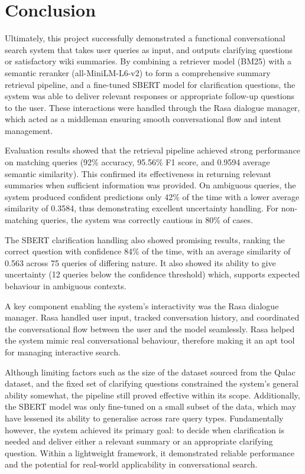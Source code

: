 \documentclass[11pt]{article}
\begin{document}
\section{Conclusion}
Ultimately, this project successfully demonstrated a functional conversational search system that takes user queries as input, and outputs clarifying questions or satisfactory wiki summaries. By combining a retriever model (BM25) with a semantic reranker (all-MiniLM-L6-v2) to form a comprehensive summary retrieval pipeline, and a fine-tuned SBERT model for clarification questions, the system was able to deliver relevant responses or appropriate follow-up questions to the user. These interactions were handled through the Rasa dialogue manager, which acted as a middleman ensuring smooth conversational flow and intent management.

Evaluation results showed that the retrieval pipeline achieved strong performance on matching queries (92\% accuracy, 95.56\% F1 score, and 0.9594 average semantic similarity). This confirmed its effectiveness in returning relevant summaries when sufficient information was provided. On ambiguous queries, the system produced confident predictions only 42\% of the time with a lower average similarity of 0.3584, thus demonstrating excellent uncertainty handling. For non-matching queries, the system was correctly cautious in 80\% of cases.

The SBERT clarification handling also showed promising results, ranking the correct question with confidence 84\% of the time, with an average similarity of 0.563 across 75 queries of differing nature. It also showed its ability to give uncertainty (12 queries below the confidence threshold) which, supports expected behaviour in ambiguous contexts.

A key component enabling the system's interactivity was the Rasa dialogue manager. Rasa handled user input, tracked conversation history, and coordinated the conversational flow between the user and the model seamlessly. Rasa helped the system mimic real conversational behaviour, therefore making it an apt tool for managing interactive search.

Although limiting factors such as the size of the dataset sourced from the Qulac dataset, and the fixed set of clarifying questions constrained the system's general ability somewhat, the pipeline still proved effective within its scope.  Additionally, the SBERT model was only fine-tuned on a small subset of the data, which may have lessened its ability to generalise across rare query types. Fundamentally however, the system achieved its primary goal: to decide when clarification is needed and deliver either a relevant summary or an appropriate clarifying question. Within a lightweight framework, it demonstrated reliable performance and the potential for real-world applicability in conversational search.
\end{document}
